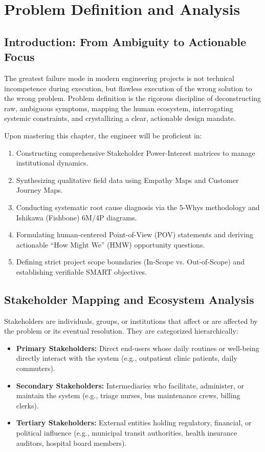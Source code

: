 \chapter{Problem Definition and Analysis}
\label{chap:problem-definition}

\section{Introduction: From Ambiguity to Actionable Focus}
The greatest failure mode in modern engineering projects is not technical incompetence during execution, but flawless execution of the wrong solution to the wrong problem. Problem definition is the rigorous discipline of deconstructing raw, ambiguous symptoms, mapping the human ecosystem, interrogating systemic constraints, and crystallizing a clear, actionable design mandate.

\begin{important}
Upon mastering this chapter, the engineer will be proficient in:
\begin{enumerate}[leftmargin=1.5em]
    \item Constructing comprehensive Stakeholder Power-Interest matrices to manage institutional dynamics.
    \item Synthesizing qualitative field data using Empathy Maps and Customer Journey Maps.
    \item Conducting systematic root cause diagnosis via the 5-Whys methodology and Ishikawa (Fishbone) 6M/4P diagrams.
    \item Formulating human-centered Point-of-View (POV) statements and deriving actionable ``How Might We'' (HMW) opportunity questions.
    \item Defining strict project scope boundaries (In-Scope vs. Out-of-Scope) and establishing verifiable SMART objectives.
\end{enumerate}
\end{important}

\section{Stakeholder Mapping and Ecosystem Analysis}
Stakeholders are individuals, groups, or institutions that affect or are affected by the problem or its eventual resolution. They are categorized hierarchically:
\begin{itemize}
    \item \textbf{Primary Stakeholders:} Direct end-users whose daily routines or well-being directly interact with the system (e.g., outpatient clinic patients, daily commuters).
    \item \textbf{Secondary Stakeholders:} Intermediaries who facilitate, administer, or maintain the system (e.g., triage nurses, bus maintenance crews, billing clerks).
    \item \textbf{Tertiary Stakeholders:} External entities holding regulatory, financial, or political influence (e.g., municipal transit authorities, health insurance auditors, hospital board members).
\end{itemize}

